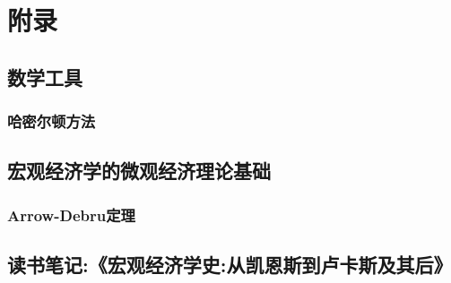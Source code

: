 \documentclass[lang=cn,10pt]{elegantbook}
\begin{document}
\part{附录}
\chapter{数学工具}
\section{哈密尔顿方法}
\chapter{宏观经济学的微观经济理论基础}
\section{Arrow-Debru定理}
\chapter{读书笔记:《宏观经济学史:从凯恩斯到卢卡斯及其后》}
\end{document}
